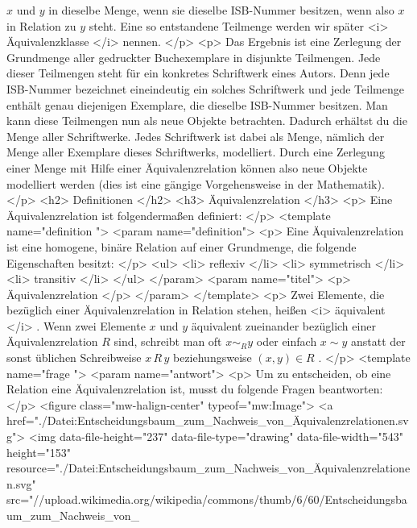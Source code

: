   $x$
   und
   $y$
   in dieselbe Menge, wenn sie dieselbe ISB-Nummer besitzen, wenn also
   $x$
   in Relation zu
   $y$
   steht. Eine so entstandene Teilmenge werden wir später
   <i>
    Äquivalenzklasse
   </i>
   nennen.
  </p>
  <p>
   Das Ergebnis ist eine Zerlegung der Grundmenge aller gedruckter Buchexemplare in disjunkte Teilmengen. Jede dieser Teilmengen steht für ein konkretes Schriftwerk eines Autors. Denn jede ISB-Nummer bezeichnet eineindeutig ein solches Schriftwerk und jede Teilmenge enthält genau diejenigen Exemplare, die dieselbe ISB-Nummer besitzen. Man kann diese Teilmengen nun als neue Objekte betrachten. Dadurch erhältst du die Menge aller Schriftwerke. Jedes Schriftwerk ist dabei als Menge, nämlich der Menge aller Exemplare dieses Schriftwerks, modelliert. Durch eine Zerlegung einer Menge mit Hilfe einer Äquivalenzrelation können also neue Objekte modelliert werden (dies ist eine gängige Vorgehensweise in der Mathematik).
  </p>
  <h2>
   Definitionen
  </h2>
  <h3>
   Äquivalenzrelation
  </h3>
  <p>
   Eine Äquivalenzrelation ist folgendermaßen definiert:
  </p>
  <template name="definition
 ">
   <param name="definition">
    <p>
     Eine Äquivalenzrelation ist eine homogene, binäre Relation auf einer Grundmenge, die folgende Eigenschaften besitzt:
    </p>
    <ul>
     <li>
      reflexiv
     </li>
     <li>
      symmetrisch
     </li>
     <li>
      transitiv
     </li>
    </ul>
   </param>
   <param name="titel">
    <p>
     Äquivalenzrelation
    </p>
   </param>
  </template>
  <p>
   Zwei Elemente, die bezüglich einer Äquivalenzrelation in Relation stehen, heißen
   <i>
    äquivalent
   </i>
   . Wenn zwei Elemente
   $x$
   und
   $y$
   äquivalent zueinander bezüglich einer Äquivalenzrelation
   $R$
   sind, schreibt man oft
   $x\sim_R y$
   oder einfach
   $x\sim y$
   anstatt der sonst üblichen Schreibweise
   $x\,R\,y$
   beziehungsweise
   $(x,y)\in R$
   .
  </p>
  <template name="frage
 ">
   <param name="antwort">
    <p>
     Um zu entscheiden, ob eine Relation eine Äquivalenzrelation ist, musst du folgende Fragen beantworten:
    </p>
    <figure class="mw-halign-center" typeof="mw:Image">
     <a href="./Datei:Entscheidungsbaum_zum_Nachweis_von_Äquivalenzrelationen.svg">
      <img data-file-height="237" data-file-type="drawing" data-file-width="543" height="153" resource="./Datei:Entscheidungsbaum_zum_Nachweis_von_Äquivalenzrelationen.svg" src="//upload.wikimedia.org/wikipedia/commons/thumb/6/60/Entscheidungsbaum_zum_Nachweis_von_%
